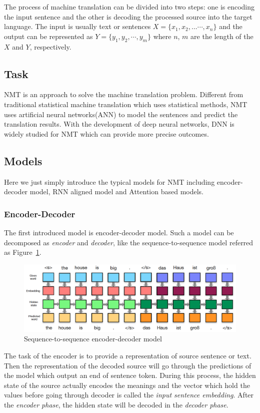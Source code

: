 \documentclass[a4paper, 12pt]{article}
\begin{document}
The process of machine translation can be divided into two steps: one is encoding the input sentence and the other is decoding the processed source into the target language. The input is usually text or sentences $X = \{x_1, x_2, ...\cdots, x_n\}$ and the output can be represented as $Y=\{y_1, y_2,\cdots, y_m\}$ where $n$, $m$ are the length of the $X$ and $Y$, respectively\cite{He}.

\subsection{Task}
NMT is an approach to solve the machine translation problem. Different from traditional statistical machine translation which uses statistical methods, NMT uses artificial neural networks(ANN) to model the sentences and predict the translation results. With the development of deep neural networks, DNN is widely studied for NMT which can provide more precise outcomes.

\subsection{Models}
Here we just simply introduce the typical models for NMT including encoder-decoder model, RNN aligned model and Attention based models. 

\subsubsection{Encoder-Decoder}
The first introduced model is encoder-decoder model. Such a model can be decomposed as \textsl{encoder} and \textsl{decoder}, like the sequence-to-sequence model\cite{seq2seq} referred as Figure~\ref{fig:seq2seq}.

\begin{figure}
\centering
\includegraphics[scale=0.6]{seq2seq.png}
\caption{\label{fig:seq2seq}Sequence-to-sequence encoder-decoder model}
\end{figure} 

The task of the encoder is to provide a representation of source sentence or text. Then the representation of the decoded source will go through the predictions of the model which output an end of sentence token. During this process, the hidden state of the source actually encodes the meanings and the vector which hold the values before going through decoder is called the \textsl{input sentence embedding}. After the \textsl{encoder phase}, the hidden state will be decoded in the \textsl{decoder phase}. 
\end{document}
